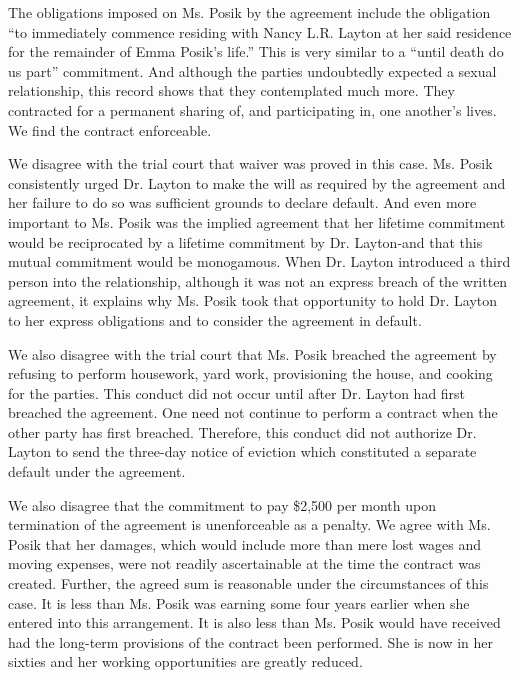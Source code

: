 The obligations imposed on Ms. Posik by the agreement include the obligation
``to immediately commence residing with Nancy L.R. Layton at her said residence
for the remainder of Emma Posik's life.'' This is very similar to a
``until death do us part'' commitment. And although the parties undoubtedly
expected a sexual relationship, this record shows that they contemplated much
more. They contracted for a permanent sharing of, and participating in, one
another's lives. We find the contract enforceable.

We disagree with the trial court that waiver was proved in this case. Ms. Posik
consistently urged Dr. Layton to make the will as required by the agreement and
her failure to do so was sufficient grounds to declare default. And even more
important to Ms. Posik was the implied agreement that her lifetime commitment
would be reciprocated by a lifetime commitment by Dr. Layton-and that this
mutual commitment would be monogamous. When Dr. Layton introduced a third
person into the relationship, although it was not an express breach of the
written agreement, it explains why Ms. Posik took that opportunity to hold Dr.
Layton to her express obligations and to consider the agreement in default.

We also disagree with the trial court that Ms. Posik breached the agreement by
refusing to perform housework, yard work, provisioning the house, and cooking
for the parties. This conduct did not occur until after Dr. Layton had first
breached the agreement. One need not continue to perform a contract when the
other party has first breached. Therefore, this conduct did not authorize Dr.
Layton to send the three-day notice of eviction which constituted a separate
default under the agreement.

We also disagree that the commitment to pay \$2,500 per month upon termination
of the agreement is unenforceable as a penalty. We agree with Ms. Posik that
her damages, which would include more than mere lost wages and moving expenses,
were not readily ascertainable at the time the contract was created. Further,
the agreed sum is reasonable under the circumstances of this case. It is less
than Ms. Posik was earning some four years earlier when she entered into this
arrangement. It is also less than Ms. Posik would have received had the
long-term provisions of the contract been performed. She is now in her sixties
and her working opportunities are greatly reduced.

